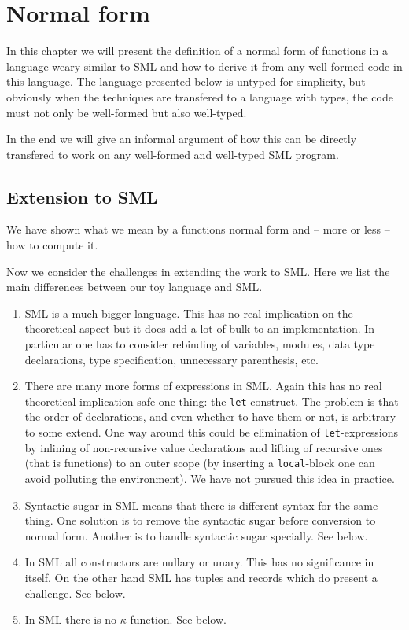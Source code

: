 \chapter{Normal form}

In this chapter we will present the definition of a normal form of functions in
a language weary similar to SML and how to derive it from any well-formed code
in this language. The language presented below is untyped for simplicity, but
obviously when the techniques are transfered to a language with types, the code
must not only be well-formed but also well-typed.

In the end we will give an informal argument of how this can be directly
transfered to work on any well-formed and well-typed SML program.



\section{Extension to SML}

We have shown what we mean by a functions normal form and -- more or less -- how
to compute it.

Now we consider the challenges in extending the work to SML. Here we list the
main differences between our toy language and SML.

\begin{enumerate}
\item SML is a much bigger language. This has no real implication on the
  theoretical aspect but it does add a lot of bulk to an implementation. In
  particular one has to consider rebinding of variables, modules, data type
  declarations, type specification, unnecessary parenthesis, etc.
\item There are many more forms of expressions in SML. Again this has no real
  theoretical implication safe one thing: the \texttt{let}-construct. The
  problem is that the order of declarations, and even whether to have them or
  not, is arbitrary to some extend. One way around this could be elimination of
  \texttt{let}-expressions by inlining of non-recursive value declarations and
  lifting of recursive ones (that is functions) to an outer scope (by inserting
  a \texttt{local}-block one can avoid polluting the environment). We have not
  pursued this idea in practice.
\item Syntactic sugar in SML means that there is different syntax for the same
  thing. One solution is to remove the syntactic sugar before conversion to
  normal form. Another is to handle syntactic sugar specially. See
   below.
\item In SML all constructors are nullary or unary. This has no significance in
  itself. On the other hand SML has tuples and records which do present a
  challenge. See  below.
\item In SML there is no $\kappa$-function. See 
  below.
\end{enumerate}


